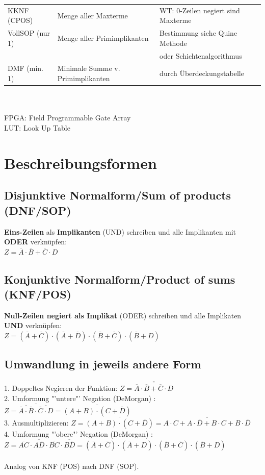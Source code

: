 \documentclass[6pt,a4paper]{scrartcl}
\newcommand{\ol}[1]{\ensuremath{\overline{#1}}}									%
\begin{document}
\begin{multicols*}{3}
\begin{tabular}{l|l|l}
		KKNF (CPOS)& Menge aller Maxterme & WT: 0-Zeilen negiert sind Maxterme \\
		VollSOP (nur 1)& Menge aller Primimplikanten & Bestimmung siehe Quine Methode\\
		& & oder Schichtenalgorithmus\\
		DMF (min. 1)& Minimale Summe v. Primimplikanten & durch Überdeckungstabelle \\
	\end{tabular}
	\\ \\
	FPGA: Field Programmable Gate Array\\
	LUT: Look Up Table\\




\section{Beschreibungsformen}
	\subsection{Disjunktive Normalform/Sum of products (DNF/SOP)}
	\textbf{Eins-Zeilen} als \textbf{Implikanten} (UND) schreiben und alle Implikanten mit \textbf{ODER} verknüpfen: \\
	$Z = \overline A \cdot \overline B + \overline C \cdot D$ 
	
	\subsection{Konjunktive Normalform/Product of sums (KNF/POS)}
	\textbf{Null-Zeilen negiert als Implikat} (ODER)  schreiben und alle Implikaten \textbf{UND} verknüpfen: \\	
	$Z = ( \ol A + \ol C) \cdot ( \ol A + \ol D) \cdot ( \ol B + \ol C) \cdot ( \ol B + D)$
	
	\subsection{Umwandlung in jeweils andere Form}
	1. Doppeltes Negieren der Funktion: $ Z = \overline {\overline{\overline A \cdot \overline B + \overline C \cdot D}}$\\
	2. Umformung "'untere"'  Negation (DeMorgan) : $ Z = \ol{\ol{\ol A \cdot \ol B} \cdot \ol{\ol C \cdot D}} = \ol{(A+B) \cdot (C+\ol D)}$\\
	3. Ausmultiplizieren: $ Z = \ol{(A+B) \cdot (C+\ol D)} = \ol{A\cdot C + A\cdot \ol D + B \cdot C + B \cdot \ol D}$\\
	4. Umformung "'obere"'  Negation (DeMorgan) :\\ $ Z= \ol{AC} \cdot \ol{A \ol D} \cdot \ol{BC} \cdot \ol{B\ol D} = ( \ol A + \ol C) \cdot ( \ol A + D) \cdot ( \ol B + \ol C) \cdot ( \ol B + D)$\\ \\
	Analog von KNF (POS) nach DNF (SOP).
	

\end{multicols*}
\end{document}
